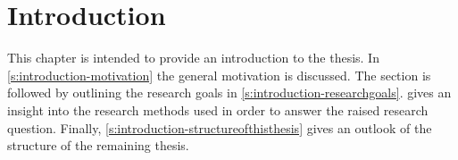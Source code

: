 
\chapter{Introduction}\label{c:introduction}

This chapter is intended to provide an introduction to the thesis.
In \cref{s:introduction-motivation} the general motivation is discussed.
The section is followed by outlining the research goals in \cref{s:introduction-researchgoals}.
 gives an insight into the research methods used in order to answer the raised research question.
Finally, \cref{s:introduction-structureofthisthesis} gives an outlook of the structure of the remaining thesis.


